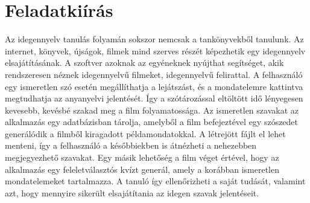 \chapter*{Feladatkiírás}

Az idegennyelv tanulás folyamán sokszor nemcsak a tankönyvekből tanulunk. Az internet, könyvek, újságok, filmek mind szerves részét képezhetik egy idegennyelv elsajátításának. A szoftver azoknak az egyéneknek nyújthat segítséget, akik rendszeresen néznek idegennyelvű filmeket, idegennyelvű felirattal. A felhasználó egy ismeretlen szó esetén megállíthatja a lejátszást, és a mondatelemre kattintva megtudhatja az anyanyelvi jelentését. Így a szótározással eltöltött idő lényegesen kevesebb, kevésbé szakad meg a film folyamatossága.
Az ismeretlen szavakat az alkalmazás egy adatbázisban tárolja, amelyből a film befejeztével egy szószedet generálódik a filmből kiragadott példamondatokkal. A létrejött fájlt el lehet menteni, így a felhasználó a későbbiekben is átnézheti a nehezebben megjegyezhető szavakat.
Egy másik lehetőség a film véget értével, hogy az alkalmazás egy feleletválasztós kvízt generál, amely a korábban ismeretlen mondatelemeket tartalmazza. A tanuló így ellenőrizheti a saját tudását, valamint azt, hogy mennyire sikerült elsajátítania az idegen szavak jelentéseit.

